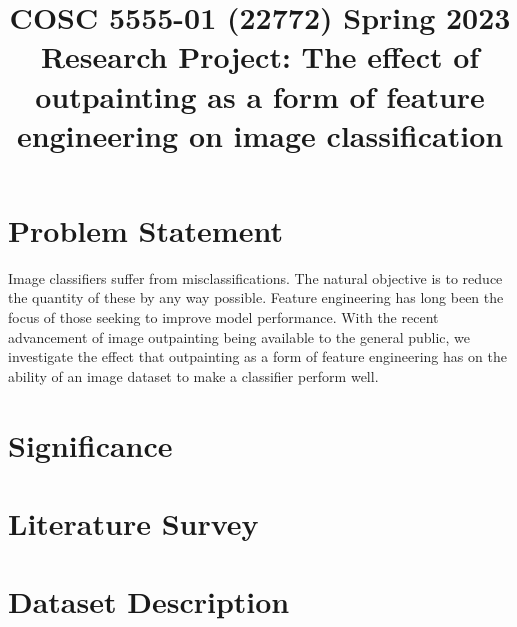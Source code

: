 \documentclass[conference]{IEEEtran}
\begin{document}
\title{COSC 5555-01 (22772) Spring 2023 Research Project: The effect of outpainting as a form of feature engineering on image classification}

\author{
\and
{}
}

\maketitle

\clearpage %

\section{Problem Statement}

Image classifiers suffer from misclassifications. The natural objective is to reduce the quantity of these by any way possible. Feature engineering has long been the focus of those seeking to improve model performance. With the recent advancement of image outpainting being available to the general public, we investigate the effect that outpainting as a form of feature engineering has on the
ability of an image dataset to make a classifier perform well.

\section{Significance}

\section{Literature Survey}

\section{Dataset Description}
\end{document}
